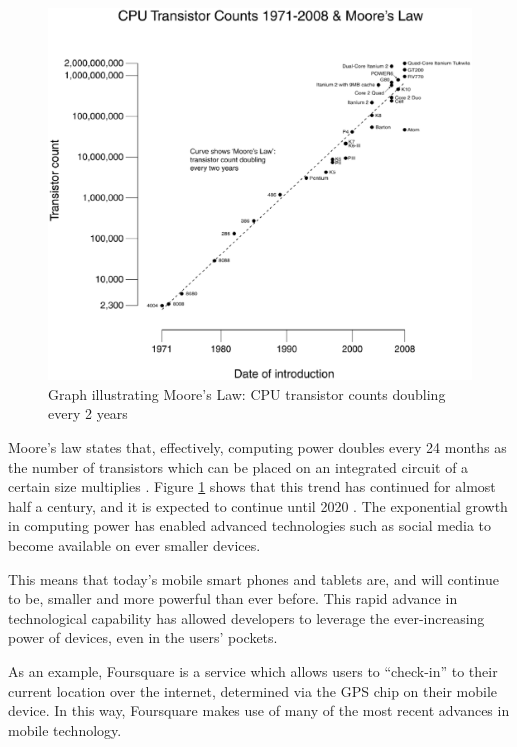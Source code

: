 \documentclass[a4paper,11pt]{article}
\begin{document}
    \begin{figure}
        \begin{center}
            \includegraphics[width=\textwidth]{moores-law}
        \end{center}
        \caption{Graph illustrating Moore's Law: CPU transistor counts doubling
        every 2 years}
        \label{fig:moores-law}
    \end{figure}

    Moore's law states that, effectively, computing power doubles every 24
    months as the number of transistors which can be placed on an integrated
    circuit of a certain size multiplies \cite{schaller1997}. Figure
    \ref{fig:moores-law} shows that this trend has continued for almost half
    a century, and it is expected to continue until 2020 \cite{kanellos2005}.
    The exponential growth in computing power has enabled advanced technologies
    such as social media to become available on ever smaller devices.

    This means that today's mobile smart phones and tablets are, and will
    continue to be, smaller and more powerful than ever before. This rapid
    advance in technological capability has allowed developers to leverage the
    ever-increasing power of devices, even in the users' pockets.

    As an example, Foursquare is a service which allows users to ``check-in''
    to their current location over the internet, determined via the GPS chip on
    their mobile device. In this way, Foursquare makes use of many of the most
    recent advances in mobile technology.
\end{document}
